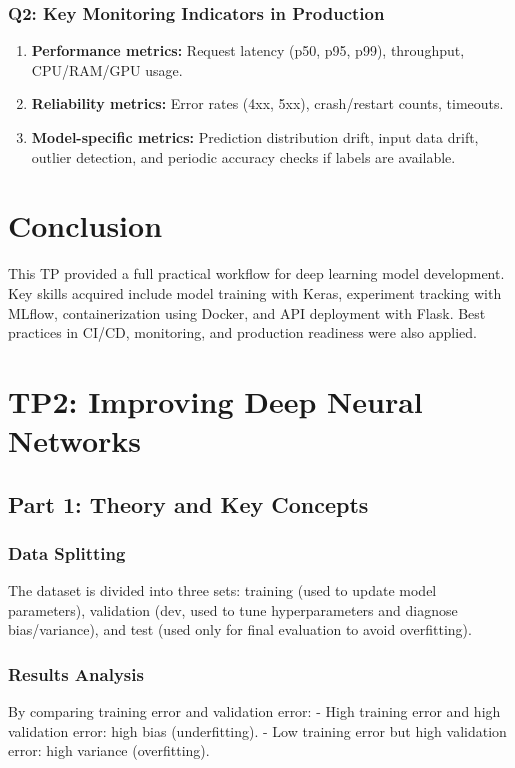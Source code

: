 \documentclass{article}
\begin{document}
\subsubsection{Q2: Key Monitoring Indicators in Production}
\begin{enumerate}[leftmargin=*]
    \item \textbf{Performance metrics:} Request latency (p50, p95, p99), throughput, CPU/RAM/GPU usage.
    \item \textbf{Reliability metrics:} Error rates (4xx, 5xx), crash/restart counts, timeouts.
    \item \textbf{Model-specific metrics:} Prediction distribution drift, input data drift, outlier detection, and periodic accuracy checks if labels are available.
\end{enumerate}

\section{Conclusion}
This TP provided a full practical workflow for deep learning model development. Key skills acquired include model training with Keras, experiment tracking with MLflow, containerization using Docker, and API deployment with Flask. Best practices in CI/CD, monitoring, and production readiness were also applied.

\section{TP2: Improving Deep Neural Networks}

\subsection{Part 1: Theory and Key Concepts}

\subsubsection{Data Splitting}
The dataset is divided into three sets: training (used to update model parameters), validation (dev, used to tune hyperparameters and diagnose bias/variance), and test (used only for final evaluation to avoid overfitting).

\subsubsection{Results Analysis}
By comparing training error and validation error:
- High training error and high validation error: high bias (underfitting).
- Low training error but high validation error: high variance (overfitting).
\end{document}
